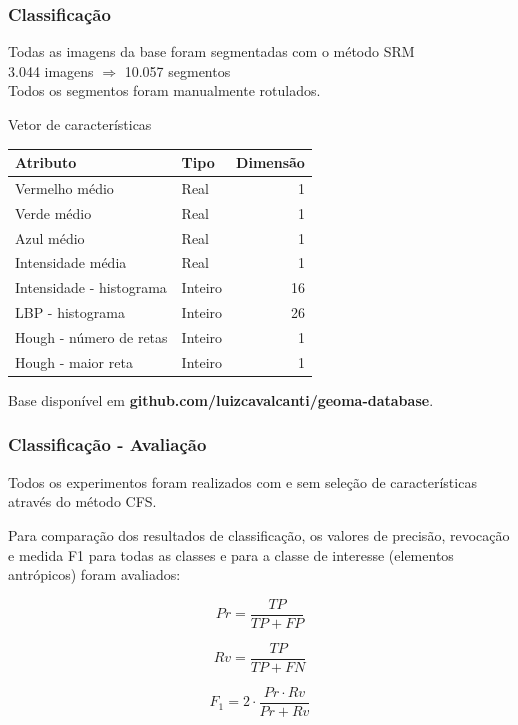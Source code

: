 \documentclass[t]{beamer}
\begin{document}
\begin{frame}[c]
	\frametitle{Classificação}

	Todas as imagens da base foram segmentadas com o método SRM\\
	\vspace{0.5cm}
	3.044 imagens $\Rightarrow$ 10.057 segmentos\\
	\vspace{0.5cm}
	Todos os segmentos foram manualmente rotulados.
	\vspace{0.2cm}

	\centering
	Vetor de características
	\small{
		\begin{table}[h]
		\centering
		\begin{tabulary}{\linewidth}{|L|L|R|}
		\hline
		\textbf{Atributo} & \textbf{Tipo} & \textbf{Dimensão} \\ \hline
		Vermelho médio            & Real    &  1 \\ \hline
		Verde médio               & Real    &  1 \\ \hline
		Azul médio                & Real    &  1 \\ \hline
		Intensidade média         & Real    &  1 \\ \hline
		Intensidade - histograma  & Inteiro & 16 \\ \hline
		LBP - histograma          & Inteiro & 26 \\ \hline
		Hough - número de retas   & Inteiro &  1 \\ \hline
		Hough - maior reta        & Inteiro &  1 \\ \hline
		\end{tabulary}
		\end{table}
	}

	\centering
	Base disponível em \textbf{github.com/luizcavalcanti/geoma-database}.

\end{frame}

\begin{frame}[c]
	\frametitle{Classificação - Avaliação}

	Todos os experimentos foram realizados com e sem seleção de características através do método CFS.

	\vspace{0.5cm}

	Para comparação dos resultados de classificação, os valores de precisão, revocação e medida F1 para todas as classes e para a classe de interesse (elementos antrópicos) foram avaliados:

	\begin{equation*}
		\displaystyle Pr = \frac{TP}{TP+FP}
	\end{equation*}

	\begin{equation*}
		\displaystyle Rv = \frac{TP}{TP+FN}
	\end{equation*}

	\begin{equation*}
		\displaystyle F_1 = 2 \cdot \frac{Pr \cdot Rv}{Pr + Rv}
	\end{equation*}
\end{frame}
\end{document}
